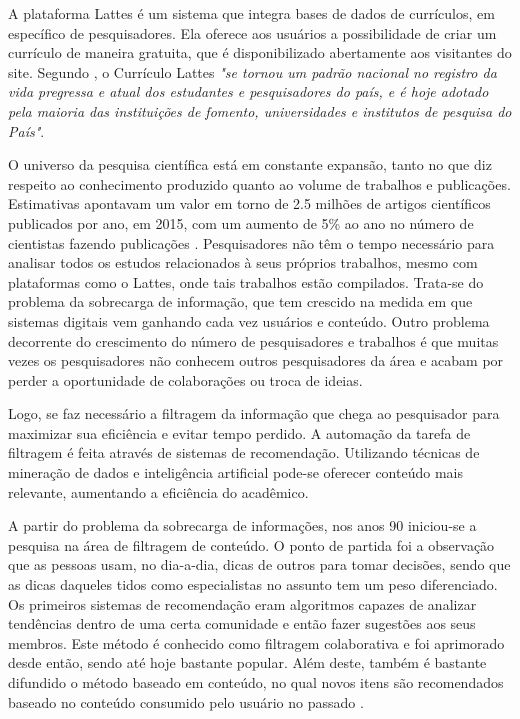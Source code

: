 \documentclass[12pt]{article}
\begin{document}
A plataforma Lattes é um sistema que integra bases de dados de currículos, em específico de pesquisadores. 
Ela oferece aos usuários a possibilidade de criar um currículo de maneira gratuita, que é disponibilizado 
abertamente aos visitantes do site. Segundo \cite{CNPq2019lattes}, o Currículo Lattes 
\textit{"se tornou um padrão nacional no registro da vida pregressa e atual dos estudantes e 
pesquisadores do país, e é hoje adotado pela maioria das instituições de fomento, universidades e 
institutos de pesquisa do País"}.
    
O universo da pesquisa científica está em constante expansão, tanto no que diz respeito ao conhecimento 
produzido quanto ao volume de trabalhos e publicações. Estimativas apontavam um valor em torno de 2.5 
milhões de artigos científicos publicados por ano, em 2015, com um aumento de 5\% ao ano no número de 
cientistas fazendo publicações \cite{ware2015stm}. Pesquisadores não têm o tempo necessário para analisar 
todos os estudos relacionados à seus próprios trabalhos, mesmo com plataformas como o Lattes, onde 
tais trabalhos estão compilados. Trata-se do problema da sobrecarga de informação, que tem crescido na 
medida em que sistemas digitais vem ganhando cada vez usuários e conteúdo. Outro problema decorrente do 
crescimento do número de pesquisadores e trabalhos é que muitas vezes os pesquisadores não conhecem outros 
pesquisadores da área e acabam por perder a oportunidade de colaborações ou troca de ideias.

Logo, se faz necessário a filtragem da informação que chega ao pesquisador para maximizar sua eficiência e 
evitar tempo perdido. A automação da tarefa de filtragem é feita através de sistemas de recomendação. 
Utilizando técnicas de mineração de dados e inteligência artificial pode-se oferecer conteúdo mais relevante, 
aumentando a eficiência do acadêmico. 

A partir do problema da sobrecarga de informações, nos anos 90 iniciou-se a pesquisa na área de filtragem de conteúdo. 
O ponto de partida foi a observação que as pessoas usam, no dia-a-dia, dicas de outros para tomar decisões, sendo que 
as dicas daqueles tidos como especialistas no assunto tem um peso diferenciado. Os primeiros sistemas de recomendação 
eram algoritmos capazes de analizar tendências dentro de uma certa comunidade e então fazer sugestões aos seus membros. 
Este método é conhecido como filtragem colaborativa e foi aprimorado desde então, sendo até hoje bastante popular. Além 
deste, também é bastante difundido o método baseado em conteúdo, no qual novos itens são recomendados baseado no 
conteúdo consumido pelo usuário no passado \cite{ricci2011introduction}.
\end{document}
